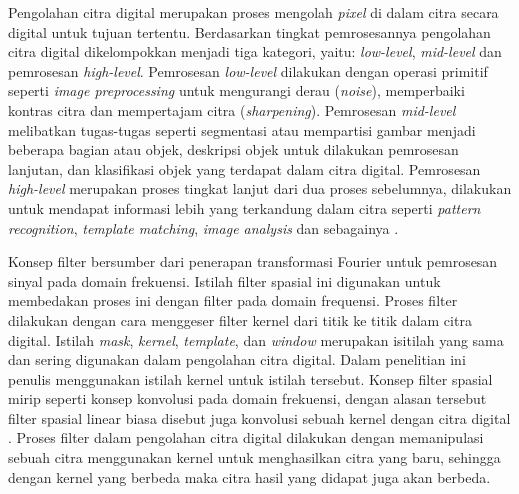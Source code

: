 Pengolahan citra digital merupakan proses mengolah \textit{pixel} di dalam citra secara digital untuk tujuan tertentu. Berdasarkan tingkat pemrosesannya pengolahan citra digital dikelompokkan menjadi tiga kategori, yaitu: \textit{low-level}, \textit{mid-level} dan pemrosesan \textit{high-level}. Pemrosesan \textit{low-level} dilakukan dengan operasi primitif seperti \textit{image preprocessing} untuk mengurangi derau (\textit{noise}), memperbaiki kontras citra dan mempertajam citra (\textit{sharpening}). Pemrosesan \textit{mid-level} melibatkan tugas-tugas seperti segmentasi atau mempartisi gambar menjadi beberapa bagian atau objek, deskripsi objek untuk dilakukan pemrosesan lanjutan, dan klasifikasi objek yang terdapat dalam citra digital. Pemrosesan \textit{high-level} merupakan proses tingkat lanjut dari dua proses sebelumnya, dilakukan untuk mendapat informasi lebih yang terkandung dalam citra seperti \textit{pattern recognition}, \textit{template matching}, \textit{image analysis} dan sebagainya .







Konsep filter bersumber dari penerapan transformasi Fourier untuk pemrosesan sinyal pada domain frekuensi. Istilah filter spasial ini digunakan untuk membedakan proses ini dengan filter pada domain frequensi. Proses filter dilakukan dengan cara menggeser filter kernel dari titik ke titik dalam citra digital. Istilah \textit{mask}, \textit{kernel}, \textit{template}, dan \textit{window} merupakan isitilah yang sama dan sering digunakan dalam pengolahan citra digital. Dalam penelitian ini penulis menggunakan istilah kernel untuk istilah tersebut. Konsep filter spasial mirip seperti konsep konvolusi pada domain frekuensi, dengan alasan tersebut filter spasial linear biasa disebut juga konvolusi sebuah kernel dengan citra digital . Proses filter dalam pengolahan citra digital dilakukan dengan memanipulasi sebuah citra menggunakan kernel untuk menghasilkan citra yang baru, sehingga dengan kernel yang berbeda maka citra hasil yang didapat juga akan berbeda. 

